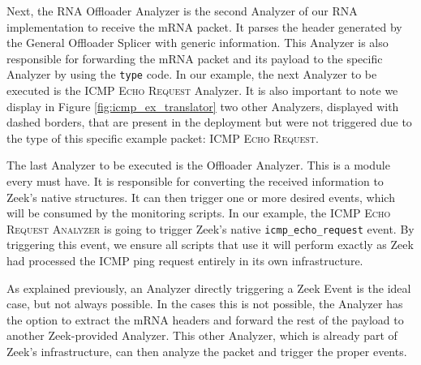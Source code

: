 
Next, the RNA Offloader Analyzer is the second Analyzer of our RNA implementation to receive the mRNA packet. It parses the header generated by the General Offloader Splicer with \Offloader{} generic information. This Analyzer is also responsible for forwarding the mRNA packet and its payload to the \Offloader{} specific Analyzer by using the \Offloader{} \texttt{type} code. In our example, the next Analyzer to be executed is the \textsc{ICMP Echo Request} Analyzer. It is also important to note we display in Figure \ref{fig:icmp_ex_translator} two other Analyzers, displayed with dashed borders, that are present in the deployment but were not triggered due to the \Offloader{} type of this specific example packet: \textsc{ICMP Echo Request}.

The last Analyzer to be executed is the Offloader Analyzer. This is a module every \Offloader{} must have. It is responsible for converting the received information to Zeek's native structures. It can then trigger one or more desired events, which will be consumed by the monitoring scripts. In our example, the \textsc{ICMP Echo Request Analyzer} is going to trigger Zeek's native \texttt{icmp\_echo\_request} event. By triggering this event, we ensure all scripts that use it will perform exactly as Zeek had processed the ICMP ping request entirely in its own infrastructure.

As explained previously, an Analyzer directly triggering a Zeek Event is the ideal case, but not always possible. In the cases this is not possible, the Analyzer has the option to extract the mRNA headers and forward the rest of the payload to another Zeek-provided Analyzer. This other Analyzer, which is already part of Zeek's infrastructure, can then analyze the packet and trigger the proper events.
